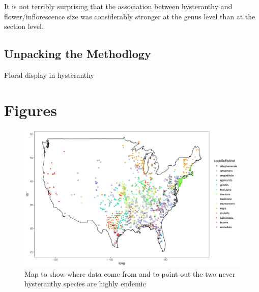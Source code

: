 \documentclass{article}\usepackage[]{graphicx}\usepackage[]{color}
\begin{document}
It is not terribly surprising that the association between hysteranthy and flower/inflorescence size was considerably stronger at the genus level than at the section level. 

\subsection*{Unpacking the Methodlogy}


\secction Floral display in hysteranthy 




\newpage
\section*{Figures}
    \begin{figure}[h!]
    \centering
 \includegraphics[width=\textwidth]{..//..//Plots/map.jpeg}
    \caption{Map to show where data come from and to point out the two never hysteranthy species are highly endemic}
    \label{fig:mappy}
\end{figure}

\end{document}
